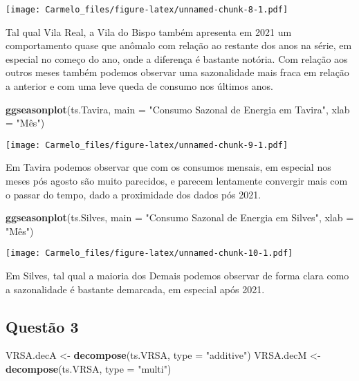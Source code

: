 \documentclass[
  14pt,
]{article}
\newenvironment{Shaded}{\begin{snugshade}}{\end{snugshade}}
\newcommand{\AttributeTok}[1]{\textcolor[rgb]{0.13,0.29,0.53}{#1}}
\newcommand{\FunctionTok}[1]{\textcolor[rgb]{0.13,0.29,0.53}{\textbf{#1}}}
\newcommand{\NormalTok}[1]{#1}
\newcommand{\OtherTok}[1]{\textcolor[rgb]{0.56,0.35,0.01}{#1}}
\newcommand{\StringTok}[1]{\textcolor[rgb]{0.31,0.60,0.02}{#1}}
\begin{document}
\texttt{[image: Carmelo\_files/figure-latex/unnamed-chunk-8-1.pdf]}

Tal qual Vila Real, a Vila do Bispo também apresenta em 2021 um
comportamento quase que anômalo com relação ao restante dos anos na
série, em especial no começo do ano, onde a diferença é bastante
notória. Com relação aos outros meses também podemos observar uma
sazonalidade mais fraca em relação a anterior e com uma leve queda de
consumo nos últimos anos.

\begin{Shaded}
\begin{Highlighting}[]
\FunctionTok{ggseasonplot}\NormalTok{(ts.Tavira, }\AttributeTok{main =} \StringTok{"Consumo Sazonal de Energia em Tavira"}\NormalTok{, }\AttributeTok{xlab =} \StringTok{"Mês"}\NormalTok{)}
\end{Highlighting}
\end{Shaded}

\texttt{[image: Carmelo\_files/figure-latex/unnamed-chunk-9-1.pdf]}

Em Tavira podemos observar que com os consumos mensais, em especial nos
meses pós agosto são muito parecidos, e parecem lentamente convergir
mais com o passar do tempo, dado a proximidade dos dados pós 2021.

\begin{Shaded}
\begin{Highlighting}[]
\FunctionTok{ggseasonplot}\NormalTok{(ts.Silves, }\AttributeTok{main =} \StringTok{"Consumo Sazonal de Energia em Silves"}\NormalTok{, }\AttributeTok{xlab =} \StringTok{"Mês"}\NormalTok{)}
\end{Highlighting}
\end{Shaded}

\texttt{[image: Carmelo\_files/figure-latex/unnamed-chunk-10-1.pdf]}

Em Silves, tal qual a maioria dos Demais podemos observar de forma clara
como a sazonalidade é bastante demarcada, em especial após 2021.

\subsection{Questão 3}\label{questuxe3o-3}

\begin{Shaded}
\begin{Highlighting}[]
\NormalTok{VRSA.decA }\OtherTok{\textless{}{-}} \FunctionTok{decompose}\NormalTok{(ts.VRSA, }\AttributeTok{type =} \StringTok{"additive"}\NormalTok{)}
\NormalTok{VRSA.decM }\OtherTok{\textless{}{-}} \FunctionTok{decompose}\NormalTok{(ts.VRSA, }\AttributeTok{type =} \StringTok{"multi"}\NormalTok{)}
\end{Highlighting}
\end{Shaded}
\end{document}
